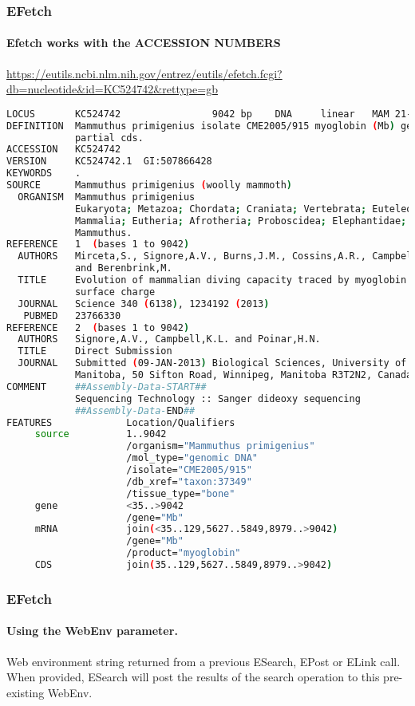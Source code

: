 \documentclass{beamer}
\begin{document}
\begin{frame}[fragile]
\frametitle{EFetch}
\framesubtitle{Efetch works with the ACCESSION NUMBERS}
\url{https://eutils.ncbi.nlm.nih.gov/entrez/eutils/efetch.fcgi?db=nucleotide&id=KC524742&rettype=gb}
\begin{lstlisting}[language=bash,basicstyle=\tiny,breaklines=false]
LOCUS       KC524742                9042 bp    DNA     linear   MAM 21-JUN-2013
DEFINITION  Mammuthus primigenius isolate CME2005/915 myoglobin (Mb) gene,
            partial cds.
ACCESSION   KC524742
VERSION     KC524742.1  GI:507866428
KEYWORDS    .
SOURCE      Mammuthus primigenius (woolly mammoth)
  ORGANISM  Mammuthus primigenius
            Eukaryota; Metazoa; Chordata; Craniata; Vertebrata; Euteleostomi;
            Mammalia; Eutheria; Afrotheria; Proboscidea; Elephantidae;
            Mammuthus.
REFERENCE   1  (bases 1 to 9042)
  AUTHORS   Mirceta,S., Signore,A.V., Burns,J.M., Cossins,A.R., Campbell,K.L.
            and Berenbrink,M.
  TITLE     Evolution of mammalian diving capacity traced by myoglobin net
            surface charge
  JOURNAL   Science 340 (6138), 1234192 (2013)
   PUBMED   23766330
REFERENCE   2  (bases 1 to 9042)
  AUTHORS   Signore,A.V., Campbell,K.L. and Poinar,H.N.
  TITLE     Direct Submission
  JOURNAL   Submitted (09-JAN-2013) Biological Sciences, University of
            Manitoba, 50 Sifton Road, Winnipeg, Manitoba R3T2N2, Canada
COMMENT     ##Assembly-Data-START##
            Sequencing Technology :: Sanger dideoxy sequencing
            ##Assembly-Data-END##
FEATURES             Location/Qualifiers
     source          1..9042
                     /organism="Mammuthus primigenius"
                     /mol_type="genomic DNA"
                     /isolate="CME2005/915"
                     /db_xref="taxon:37349"
                     /tissue_type="bone"
     gene            <35..>9042
                     /gene="Mb"
     mRNA            join(<35..129,5627..5849,8979..>9042)
                     /gene="Mb"
                     /product="myoglobin"
     CDS             join(35..129,5627..5849,8979..>9042)

\end{lstlisting}
\end{frame}


\begin{frame}[fragile]
\frametitle{EFetch}
\framesubtitle{Using the WebEnv parameter.}
Web environment string returned from a previous ESearch, EPost or ELink call. When provided, ESearch will post the results of the search operation to this pre-existing WebEnv.
\end{frame}
\end{document}

